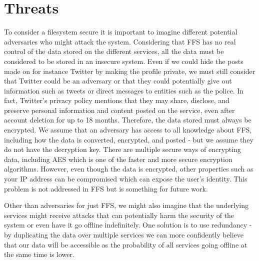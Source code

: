 \section{Threats}
To consider a filesystem secure it is important to imagine different potential adversaries who might attack the system. Considering that FFS has no real control of the data stored on the different services, all the data must be considered to be stored in an insecure system. Even if we could hide the posts made on for instance Twitter by making the profile private, we must still consider that Twitter could be an adversary or that they could potentially give out information such as tweets or direct messages to entities such as the police. In fact, Twitter's privacy policy mentions that they may share, disclose, and preserve personal information and content posted on the service, even after account deletion for up to 18 months\cite{TwitterPrivacyPolicy}. Therefore, the data stored must always be encrypted. We assume that an adversary has access to all knowledge about FFS, including how the data is converted, encrypted, and posted - but we assume they do not have the decryption key. There are multiple secure ways of encrypting data, including AES which is one of the faster and more secure encryption algorithms\cite{mahajanStudyEncryptionAlgorithms2013}. However, even though the data is encrypted, other properties such as your IP address can be compromised which can expose the user's identity. This problem is not addressed in FFS but is something for future work.

Other than adversaries for just FFS, we might also imagine that the underlying services might receive attacks that can potentially harm the security of the system or even have it go offline indefinitely. One solution is to use redundancy - by duplicating the data over multiple services we can more confidently believe that our data will be accessible as the probability of all services going offline at the same time is lower.